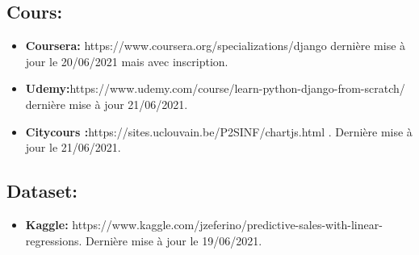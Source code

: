 \documentclass[a4paper,12pt]{report}
\begin{document}
\begin{doublespace}
\begin{doublespace}
\begin{doublespace}
\begin{doublespace}
\begin{doublespace}
\begin{doublespace}
\subsection{Cours:}
\begin{itemize}
 \item \textbf{Coursera:} https://www.coursera.org/specializations/django dernière mise à jour le 20/06/2021 mais avec inscription.
 \item\textbf{Udemy:}https://www.udemy.com/course/learn-python-django-from-scratch/ dernière mise à jour 21/06/2021.
 \item \textbf{Citycours :}https://sites.uclouvain.be/P2SINF/chartjs.html . Dernière mise à jour le 21/06/2021. 
\end{itemize}
\subsection{Dataset:}
 \begin{itemize}
     \item \textbf{Kaggle:} https://www.kaggle.com/jzeferino/predictive-sales-with-linear-regressions. Dernière mise à jour le 19/06/2021.
 \end{itemize}
\end{doublespace}
\end{doublespace}
\end{doublespace}
\end{doublespace}
\end{doublespace}
\end{doublespace}
\end{document}
